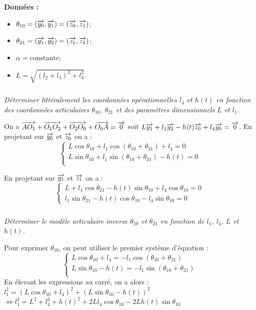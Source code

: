 \documentclass[10pt,fleqn]{article} %
\begin{document}
\begin{multicols}{2}
\textbf{Données : }
\begin{itemize}
\item $\theta_{10}=\left(\overrightarrow{y_0},\overrightarrow{y_1}\right)=\left(\overrightarrow{z_0},\overrightarrow{z_1}\right)$;
\item $\theta_{21}=\left(\overrightarrow{y_1},\overrightarrow{y_2}\right)=\left(\overrightarrow{z_1},\overrightarrow{z_2}\right)$;
\item $\alpha=\text{constante}$;
\item $L=\sqrt{\left(l_2+l_3\right)^2+l_4^2}$.
\end{itemize}

\subparagraph{}\textit{Déterminer littéralement les coordonnées opérationnelles $l_4$ et $h(t)$ en fonction des coordonnées articulaires $\theta_{10}$, $\theta_{21}$ et des paramètres dimensionnels $L$ et $l_1$.}
\ifprof
\begin{corrige}
On a $\overrightarrow{A O_1}+\overrightarrow{O_1 O_2}+\overrightarrow{O_2 O_0}+\overrightarrow{O_0 A}=\overrightarrow{0}$ soit 
$L\overrightarrow{y_1}+l_1\overrightarrow{y_2}-h(t)\overrightarrow{z_0}+l_4\overrightarrow{y_0}=\overrightarrow{0}$. 
En projetant sur $\overrightarrow{y_0}$ et $\overrightarrow{z_0}$ on a :
$$
\left\{
\begin{array}{l}
L\cos\theta_{10} +l_1\cos\left(\theta_{10}+\theta_{21}\right)+l_4={0} \\
L\sin\theta_{10}  +l_1\sin\left(\theta_{10}+\theta_{21}\right)-h(t) ={0} \\
\end{array}
\right.
$$

En projetant sur $\overrightarrow{y_1}$ et $\overrightarrow{z_1}$ on a :
$$
\left\{
\begin{array}{l}
L+l_1\cos\theta_{21}-h(t)\sin\theta_{10}+l_4\cos\theta_{10}={0} \\
l_1\sin\theta_{21}-h(t)\cos\theta_{10}-l_4\sin\theta_{10}={0}
\end{array}
\right.
$$


\end{corrige}
\else
\fi


\subparagraph{}\textit{Déterminer le modèle articulaire inverse $\theta_{10}$ et $\theta_{21}$ en fonction de $l_1$, $l_4$, $L$ et $h(t)$.}
\ifprof
\begin{corrige}
Pour exprimer $\theta_{10}$, on peut utiliser le premier système d'équation : 
$$
\left\{
\begin{array}{l}
L\cos\theta_{10}+l_4 =-l_1\cos\left(\theta_{10}+\theta_{21}\right) \\
L\sin\theta_{10}-h(t)  =-l_1\sin\left(\theta_{10}+\theta_{21}\right) \\
\end{array}
\right.
$$
En élevant les expressions au carré, on a alors : 
$
l_1^2 = \left(L\cos\theta_{10}+l_4 \right)^2+ \left(L\sin\theta_{10}-h(t)\right)^2
$
$
\Leftrightarrow 
l_1^2 = L^2+l_4^2 +h(t)^2+2Ll_4\cos\theta_{10} -2Lh(t)\sin\theta_{10}
$


\end{corrige}
\end{multicols}
\end{document}
